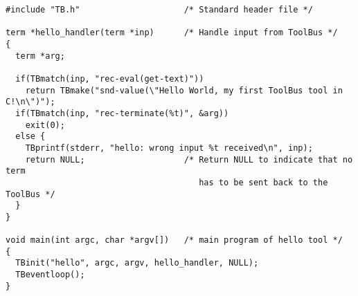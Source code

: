 \begin{verbatim}
#include "TB.h"                     /* Standard header file */

term *hello_handler(term *inp)      /* Handle input from ToolBus */
{
  term *arg;

  if(TBmatch(inp, "rec-eval(get-text)"))
    return TBmake("snd-value(\"Hello World, my first ToolBus tool in C!\n\")");
  if(TBmatch(inp, "rec-terminate(%t)", &arg))
    exit(0);
  else {
    TBprintf(stderr, "hello: wrong input %t received\n", inp);
    return NULL;                    /* Return NULL to indicate that no term
                                       has to be sent back to the ToolBus */
  }
}

void main(int argc, char *argv[])   /* main program of hello tool */
{
  TBinit("hello", argc, argv, hello_handler, NULL);
  TBeventloop();
}
\end{verbatim}

